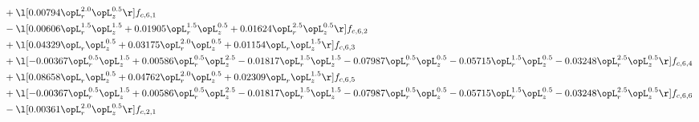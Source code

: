 \begin{alignat}{2}
& + \l[  0.00794 \opL_r^{2.0} \opL_z^{0.5}  \r] f_{c,6,1} \nonumber \\ 
& - \l[  0.00606 \opL_r^{1.5} \opL_z^{1.5} +  0.01905 \opL_r^{1.5} \opL_z^{0.5} +  0.01624 \opL_r^{2.5} \opL_z^{0.5}  \r] f_{c,6,2} \nonumber \\ 
& + \l[  0.04329 \opL_r \opL_z^{0.5} +  0.03175 \opL_r^{2.0} \opL_z^{0.5} +  0.01154 \opL_r \opL_z^{1.5}  \r] f_{c,6,3} \nonumber \\ 
& + \l[  -0.00367 \opL_r^{0.5} \opL_z^{1.5} +  0.00586 \opL_r^{0.5} \opL_z^{2.5}   -0.01817 \opL_r^{1.5} \opL_z^{1.5}   -0.07987 \opL_r^{0.5} \opL_z^{0.5}   -0.05715 \opL_r^{1.5} \opL_z^{0.5}   -0.03248 \opL_r^{2.5} \opL_z^{0.5}  \r] f_{c,6,4} \nonumber \\ 
& + \l[  0.08658 \opL_r \opL_z^{0.5} +  0.04762 \opL_r^{2.0} \opL_z^{0.5} +  0.02309 \opL_r \opL_z^{1.5}  \r] f_{c,6,5} \nonumber \\ 
& + \l[  -0.00367 \opL_r^{0.5} \opL_z^{1.5} +  0.00586 \opL_r^{0.5} \opL_z^{2.5}   -0.01817 \opL_r^{1.5} \opL_z^{1.5}   -0.07987 \opL_r^{0.5} \opL_z^{0.5}   -0.05715 \opL_r^{1.5} \opL_z^{0.5}   -0.03248 \opL_r^{2.5} \opL_z^{0.5}  \r] f_{c,6,6} \nonumber \\ 
& - \l[  0.00361 \opL_r^{2.0} \opL_z^{0.5}  \r] f_{c,2,1} \nonumber \\ 
\end{alignat} 


